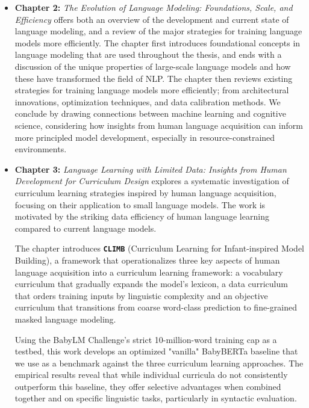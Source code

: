 \begin{itemize}

    \item \textbf{Chapter 2:} \emph{The Evolution of Language Modeling: Foundations, Scale, and Efficiency} offers both an overview of the development and current state of language modeling, and a review of the major strategies for training language models more efficiently. The chapter first introduces foundational concepts in language modeling that are used throughout the thesis, and ends with a discussion of the unique properties of large-scale language models and how these have transformed the field of NLP. The chapter then reviews existing strategies for training language models more efficiently; from architectural innovations, optimization techniques, and data calibration methods. We conclude by drawing connections between machine learning and cognitive science, considering how insights from human language acquisition can inform more principled model development, especially in resource-constrained environments.

    \item \textbf{Chapter 3:} \emph{Language Learning with Limited Data: Insights from Human Development for Curriculum Design}  
    explores a systematic investigation of curriculum learning strategies inspired by human language acquisition, focusing on their application to small language models. The work is motivated by the striking data efficiency of human language learning compared to current language models.

    The chapter introduces \textbf{\texttt{CLIMB}} (Curriculum Learning for Infant-inspired Model Building), a framework that operationalizes three key aspects of human language acquisition into a curriculum learning framework: a vocabulary curriculum that gradually expands the model's lexicon, a data curriculum that orders training inputs by linguistic complexity and an objective curriculum that transitions from coarse word-class prediction to fine-grained masked language modeling.

    Using the BabyLM Challenge's strict 10-million-word training cap as a testbed, this work develops an optimized "vanilla" BabyBERTa baseline that we use as a benchmark against the three curriculum learning approaches. The empirical results reveal that while individual curricula do not consistently outperform this baseline, they offer selective advantages when combined together and on specific linguistic tasks, particularly in syntactic evaluation.


\end{itemize}

